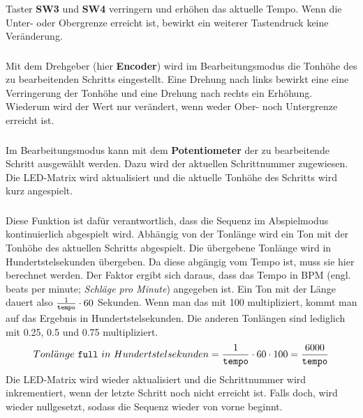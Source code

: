 \subsubsection{} %
\label{ssub:void_button_sw3_pressed}
Taster \textbf{SW3} und \textbf{SW4} verringern und erhöhen das aktuelle Tempo. Wenn die Unter- oder Obergrenze erreicht ist, bewirkt ein weiterer Tastendruck keine Veränderung.

\subsubsection{} %
\label{ssub:void_encoder_left&right}
Mit dem Drehgeber (hier \textbf{Encoder}) wird im Bearbeitungsmodus die Tonhöhe des zu bearbeitenden Schritts eingestellt. Eine Drehung nach links bewirkt eine eine Verringerung der Tonhöhe und eine Drehung nach rechts ein Erhöhung. Wiederum wird der Wert nur verändert, wenn weder Ober- noch Untergrenze erreicht ist.

\subsubsection{} %
\label{ssub:void_potentionmeter_turned}
Im Bearbeitungsmodus kann mit dem \textbf{Potentiometer} der zu bearbeitende Schritt ausgewählt werden. Dazu wird  der aktuellen Schrittnummer  zugewiesen. Die LED-Matrix wird aktualisiert und die aktuelle Tonhöhe des Schritts wird kurz angespielt.

\subsubsection{} %
\label{ssub:void_play_next_step}
Diese Funktion ist dafür verantwortlich, dass die Sequenz im Abspielmodus kontinuierlich abgespielt wird. Abhängig von der Tonlänge wird ein Ton mit der Tonhöhe des aktuellen Schritts abgespielt. Die übergebene Tonlänge wird in Hundertstelsekunden übergeben. Da diese abgängig vom Tempo ist, muss sie hier berechnet werden. Der Faktor ergibt sich daraus, dass das Tempo in BPM (engl. beats per minute; \textsl{Schläge pro Minute}) angegeben ist. Ein Ton mit der Länge  dauert also \(\frac{1}{\texttt{tempo}}\cdot60\) Sekunden. Wenn man das mit 100 multipliziert, kommt man auf das Ergebnis in Hundertstelsekunden. Die anderen Tonlängen sind lediglich mit 0.25, 0.5 und 0.75 multipliziert.
\[
Tonl\ddot{a}nge~\texttt{full}~in~Hundertstelsekunden=\frac{1}{\texttt{tempo}}\cdot60\cdot100=\frac{6000}{\texttt{tempo}}
\]
\newline
Die LED-Matrix wird wieder aktualisiert und die Schrittnummer wird inkrementiert, wenn der letzte Schritt noch nicht erreicht ist. Falls doch, wird  wieder nullgesetzt, sodass die Sequenz wieder von vorne beginnt.


